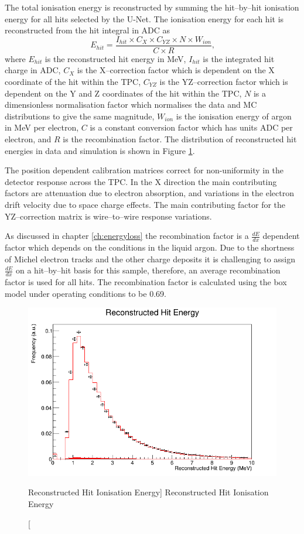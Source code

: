 The total ionisation energy is reconstructed by summing the hit--by--hit
ionisation energy for all hits selected by the U-Net. The ionisation energy for
each hit is reconstructed from the hit integral in ADC as 
\begin{equation}
	E_{hit} = \frac{I_{hit} \times C_X \times C_{YZ} \times N \times W_{ion}}{C \times R}\mbox{,}
\end{equation}
where $E_{hit}$ is the reconstructed hit energy in MeV, $I_{hit}$ is the
integrated hit charge in ADC, $C_X$ is the X--correction factor which is
dependent on the X coordinate of the hit within the TPC, $C_{YZ}$ is the 
YZ--correction factor which is dependent on the Y and Z coordinates 
of the hit within the TPC, $N$ is a dimensionless normalisation factor which
normalises the data and MC distributions to give the same magnitude, $W_{ion}$
is the ionisation energy of argon in MeV per electron, $C$ is a constant
conversion factor which has units ADC per electron, and $R$ is the
recombination factor. The distribution of reconstructed hit energies in
\protodune{} data and simulation is shown in Figure \ref{fig:hit_ion_reco}.

The position dependent calibration matrices correct for non-uniformity in the
detector response across the TPC. In the X direction the main contributing
factors are attenuation due to electron absorption, and variations in the
electron drift velocity due to space charge effects. The main contributing
factor for the YZ--correction matrix is wire--to--wire response variations.

As discussed in chapter \ref{ch:energyloss} the recombination factor is a
$\frac{dE}{dx}$ dependent factor which depends on the conditions in the liquid
argon. Due to the shortness of Michel electron tracks and the other charge 
deposits it is challenging to assign $\frac{dE}{dx}$ on a hit--by--hit 
basis for this sample, therefore, an average recombination factor is used for 
all hits. The recombination factor is calculated using the box model 
\cite{TODO} under \protodune{} operating conditions to be 0.69.

\begin{figure}
	\centering
	\includegraphics[width=\textwidth]{figures/hit_ion_reco.png}
	\caption
	[Reconstructed Hit Ionisation Energy]
	{Reconstructed Hit Ionisation Energy}
	\label{fig:hit_ion_reco}
\end{figure}

